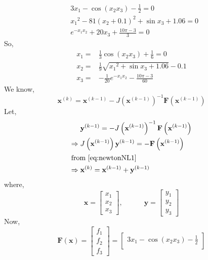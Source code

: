 \documentclass[../main-sheet.tex]{subfiles}
\begin{document}
\begin{ex}
    \begin{align*}
        &3x_1-\cos(x_2x_3)-\frac{1}{2}=0\\
        &{x_1}^2-81(x_2+0.1)^2+\sin x_3+1.06=0\\
        &e^{-x_1x_2}+20x_3+\frac{10\pi -3}{3}=0
    \end{align*}
    So,
    \begin{align*}
        x_1=&\frac{1}{3}\cos(x_2x_3)+\frac{1}{6}=0\\
        x_2=&\frac{1}{9}\sqrt{{x_1}^2+\sin x_3+1.06}-0.1\\
        x_3=&-\frac{1}{20}e^{-x_1x_2}-\frac{10\pi -3}{60}
    \end{align*}
    We know,
    \begin{equation}
        \mathbf{x}^{(k)}=\mathbf{x}^{(k-1)}-J\left( \mathbf{x}^{(k-1)} \right)^{-1}\mathbf{F}\left( \mathbf{x}^{(k-1)} \right)
        \label{eq:newtonNL1}
    \end{equation}
    Let,
    \begin{align}
        &\mathbf{y}^{(k-1)}=-J\left( \mathbf{x}^{(k-1)} \right)^{-1}\mathbf{F}\left( \mathbf{x}^{(k-1)} \right)\notag\\
        \Rightarrow\;&J\left( \mathbf{x}^{(k-1)} \right)\mathbf{y}^{(k-1)}=-\mathbf{F}\left( \mathbf{x}^{(k-1)} \right)\label{eq:newtonNL2}\\
        \intertext{from \eqref{eq:newtonNL1}}
        \Rightarrow\;&\mathbf{x}^{(k)}=\mathbf{x}^{(k-1)}+\mathbf{y}^{(k-1)}\label{eq:newtonNL3}
    \end{align}
    where,
    \[
        \mathbf{x}=\begin{bmatrix}
            x_1\\
            x_2\\
            x_3
        \end{bmatrix},\qquad\quad
        \mathbf{y}=\begin{bmatrix}
            y_1\\
            y_2\\
            y_3
        \end{bmatrix}
    \]
    Now,
    \[
        \mathbf{F}(\mathbf{x})=\begin{bmatrix}
            f_1\\
            f_2\\
            f_3
        \end{bmatrix}=
        \begin{bmatrix}
            3x_1-\cos(x_2x_3)-\frac{1}{2}\\[1em]

\end{bmatrix}\]
\end{ex}
\end{document}

